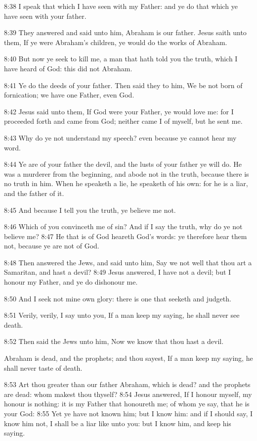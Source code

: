 8:38 I speak that which I have seen with my Father: and ye do that
which ye have seen with your father.

8:39 They answered and said unto him, Abraham is our father. Jesus
saith unto them, If ye were Abraham's children, ye would do the works
of Abraham.

8:40 But now ye seek to kill me, a man that hath told you the truth,
which I have heard of God: this did not Abraham.

8:41 Ye do the deeds of your father. Then said they to him, We be not
born of fornication; we have one Father, even God.

8:42 Jesus said unto them, If God were your Father, ye would love me:
for I proceeded forth and came from God; neither came I of myself, but
he sent me.

8:43 Why do ye not understand my speech? even because ye cannot hear
my word.

8:44 Ye are of your father the devil, and the lusts of your father ye
will do. He was a murderer from the beginning, and abode not in the
truth, because there is no truth in him. When he speaketh a lie, he
speaketh of his own: for he is a liar, and the father of it.

8:45 And because I tell you the truth, ye believe me not.

8:46 Which of you convinceth me of sin? And if I say the truth, why do
ye not believe me?  8:47 He that is of God heareth God's words: ye
therefore hear them not, because ye are not of God.

8:48 Then answered the Jews, and said unto him, Say we not well that
thou art a Samaritan, and hast a devil?  8:49 Jesus answered, I have
not a devil; but I honour my Father, and ye do dishonour me.

8:50 And I seek not mine own glory: there is one that seeketh and
judgeth.

8:51 Verily, verily, I say unto you, If a man keep my saying, he shall
never see death.

8:52 Then said the Jews unto him, Now we know that thou hast a devil.

Abraham is dead, and the prophets; and thou sayest, If a man keep my
saying, he shall never taste of death.

8:53 Art thou greater than our father Abraham, which is dead? and the
prophets are dead: whom makest thou thyself?  8:54 Jesus answered, If
I honour myself, my honour is nothing: it is my Father that honoureth
me; of whom ye say, that he is your God: 8:55 Yet ye have not known
him; but I know him: and if I should say, I know him not, I shall be a
liar like unto you: but I know him, and keep his saying.

